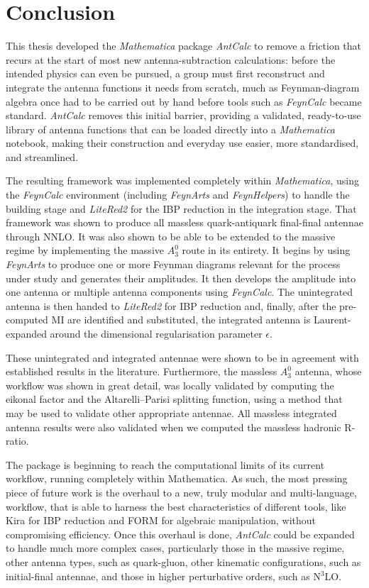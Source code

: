 \chapter{Conclusion}\label{ch:conclusion}

This thesis developed the \textit{Mathematica} package \textit{AntCalc} to remove a friction
that recurs at the start of most new antenna-subtraction calculations: before the intended
physics can even be pursued, a group must first reconstruct and integrate the antenna functions
it needs from scratch, much as Feynman-diagram algebra once had to be carried out by hand before
tools such as \textit{FeynCalc} became standard. \textit{AntCalc} removes this initial barrier,
providing a validated, ready-to-use library of antenna functions that can be loaded directly into
a \textit{Mathematica} notebook, making their construction and everyday use easier, more
standardised, and streamlined.

The resulting framework was implemented completely within \textit{Mathematica}, 
using the \textit{FeynCalc} environment (including \textit{FeynArts} and 
\textit{FeynHelpers}) to handle the building stage and
\textit{LiteRed2} for the IBP reduction in the integration stage. That framework was 
shown to produce all massless quark-antiquark final-final antennae through NNLO. 
It was also shown to be able to be extended to the massive regime by implementing the
massive $A_3^0$ route in its entirety. It begins by 
using \textit{FeynArts} to produce one or more Feynman diagrams relevant for the 
process under study and generates their amplitudes. 
It then develops the amplitude into one antenna or multiple 
antenna components using \textit{FeynCalc}. 
The unintegrated antenna is then handed to \textit{LiteRed2} 
for IBP reduction and, finally, after the pre-computed MI are identified and substituted,
the integrated antenna is Laurent-expanded around the dimensional regularisation 
parameter $\epsilon$.

These unintegrated and integrated antennae were shown to be in agreement with 
established results in the literature. Furthermore, the massless $A_3^0$ antenna, 
whose workflow was shown in great detail, was locally validated by computing the 
eikonal factor and the Altarelli--Parisi splitting function, using a method that 
may be used to validate other appropriate antennae. All massless integrated antenna results 
were also validated when we computed the massless hadronic R-ratio. 

The package is beginning to reach the computational limits of its current 
workflow, running completely within Mathematica. As such, the most pressing piece of 
future work is the overhaul to a new, truly modular and multi-language, workflow,
that is able to harness the best characteristics of different tools, like Kira for 
IBP reduction and FORM for algebraic manipulation, without compromising efficiency.
Once this overhaul is done, \textit{AntCalc} could be expanded 
to handle much more complex cases, particularly those in the massive regime, 
other antenna types, such as quark-gluon, other kinematic configurations, such as 
initial-final antennae, and those in higher perturbative orders, such as N$^3$LO.